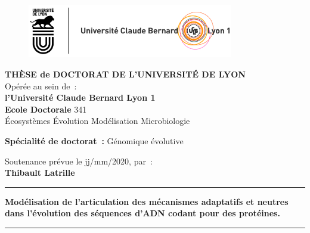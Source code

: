 \thispagestyle{empty}

\unitlength 1cm
\begin{center}
	
	\vspace*{-2.5cm}
	\begin{figure}[h]
		\centering
		\includegraphics[width=0.8\textwidth]{figures/logos.jpg}
	\end{figure}
	
	
	
	{\large \textbf{THÈSE de DOCTORAT DE L'UNIVERSITÉ DE LYON}\\}
	{Opérée au sein de~:\\}
	{\large \textbf{l'Université Claude Bernard Lyon 1}\\}
	\vspace{12pt}
	{\large \textbf{Ecole Doctorale} 341 \\Écosystèmes Évolution Modélisation Microbiologie}
	
	
	\vspace{12pt}
	
	{\large \textbf{Spécialité de doctorat~:} Génomique évolutive
		\\}
	
	\vspace{0.8cm}
	
	{Soutenance prévue le jj/mm/2020, par~:\\}
	\vspace{0.15cm} 
	{\Large \textbf{Thibault Latrille}}
	\vspace{0.5cm}           
	
	
	\rule{5cm}{1pt}
	\vspace{12pt}
	
	{\huge \textbf{Modélisation de l'articulation des mécanismes adaptatifs et neutres dans l’évolution des séquences d’ADN codant pour des protéines.}\par}
	
	\vspace{12pt}
	\rule{5cm}{1pt}
	
	\vspace{0.5cm}
	
\end{center}

